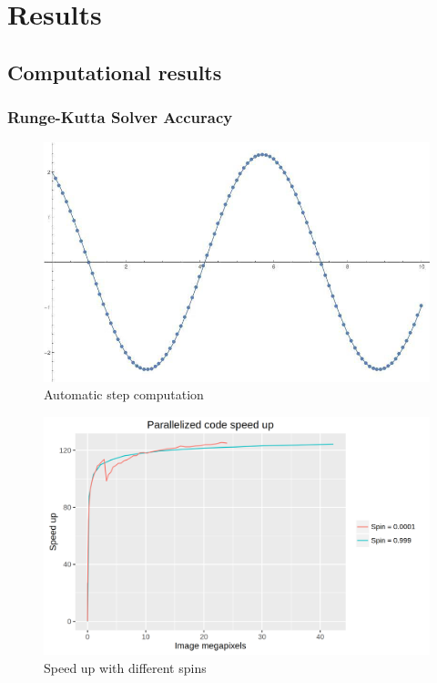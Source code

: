 \chapter{Results}

\section{Computational results}


\subsection{Runge-Kutta Solver Accuracy}

\begin{figure}[bth]
	\myfloatalign
	\includegraphics[width=.8\linewidth]{gfx/stepcomputation}
	\caption[Automatic step computation]{Automatic step computation}
	\label{fig:stepsize}
\end{figure}

\begin{figure}[bth]
	\myfloatalign
	\includegraphics[width=.8\linewidth]{gfx/speedup}
	\caption[Speed up with different spins]{Speed up with different spins}
	\label{fig:speedup}
\end{figure}

